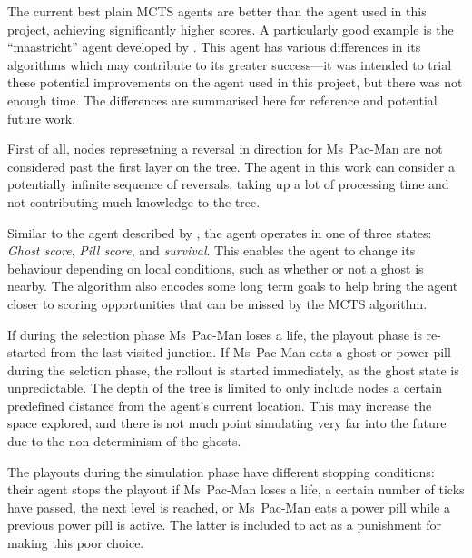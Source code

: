 The current best plain MCTS agents are better than the agent used in this project, achieving significantly higher scores.  A particularly good example is the ``maastricht'' agent developed by \citep{Pepels2012}.  This agent has various differences in its algorithms which may contribute to its greater success---it was intended to trial these potential improvements on the agent used in this project, but there was not enough time.  The differences are summarised here for reference and potential future work.

First of all, nodes represetning a reversal in direction for Ms~Pac-Man are not considered past the first layer on the tree.  The agent in this work can consider a potentially infinite sequence of reversals, taking up a lot of processing time and not contributing much knowledge to the tree.

Similar to the agent described by \cite{Ikehata2011}, the agent operates in one of three states: \emph{Ghost score}, \emph{Pill score}, and \emph{survival}. This enables the agent to change its behaviour depending on local conditions, such as whether or not a ghost is nearby.  The algorithm also encodes some long term goals to help bring the agent closer to scoring opportunities that can be missed by the MCTS algorithm.

If during the selection phase Ms~Pac-Man loses a life, the playout phase is re-started from the last visited junction.  If Ms~Pac-Man eats a ghost or power pill during the selction phase, the rollout is started immediately, as the ghost state is unpredictable.  The depth of the tree is limited to only include nodes a certain predefined distance from the agent's current location.  This may increase the space explored, and there is not much point simulating very far into the future due to the non-determinism of the ghosts.

The playouts during the simulation phase have different stopping conditions: their agent stops the playout if Ms~Pac-Man loses a life, a certain number of ticks have passed, the next level is reached, or Ms~Pac-Man eats a power pill while a previous power pill is active.  The latter is included to act as a punishment for making this poor choice.



